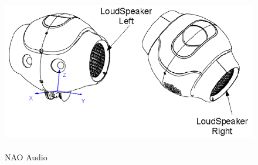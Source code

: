 \begin{figure}
	[h] \centering 
	\includegraphics[height=7cm]{figures/content/nao-audio.png} \caption{NAO Audio} \label{fg:nao:audio} 
\end{figure}
